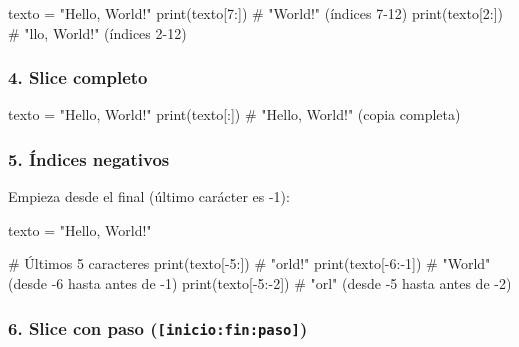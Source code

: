 \documentclass[
  doc,
  floatsintext,
  longtable,
  a4paper,
  nolmodern,
  notxfonts,
  notimes,
  12pt,
  colorlinks=true,linkcolor=blue,citecolor=blue,urlcolor=blue]{apa7}
\newenvironment{Shaded}{\begin{snugshade}}{\end{snugshade}}
\newcommand{\BuiltInTok}[1]{\textcolor[rgb]{0.00,0.23,0.31}{#1}}
\newcommand{\CommentTok}[1]{\textcolor[rgb]{0.37,0.37,0.37}{#1}}
\newcommand{\DecValTok}[1]{\textcolor[rgb]{0.68,0.00,0.00}{#1}}
\newcommand{\NormalTok}[1]{\textcolor[rgb]{0.00,0.23,0.31}{#1}}
\newcommand{\OperatorTok}[1]{\textcolor[rgb]{0.37,0.37,0.37}{#1}}
\newcommand{\StringTok}[1]{\textcolor[rgb]{0.13,0.47,0.30}{#1}}
\begin{document}
\begin{Shaded}
\begin{Highlighting}[]
\NormalTok{texto }\OperatorTok{=} \StringTok{"Hello, World!"}
\BuiltInTok{print}\NormalTok{(texto[}\DecValTok{7}\NormalTok{:])   }\CommentTok{\# "World!" (índices 7{-}12)}
\BuiltInTok{print}\NormalTok{(texto[}\DecValTok{2}\NormalTok{:])   }\CommentTok{\# "llo, World!" (índices 2{-}12)}
\end{Highlighting}
\end{Shaded}

\subsubsection{4. Slice completo}\label{slice-completo}

\begin{Shaded}
\begin{Highlighting}[]
\NormalTok{texto }\OperatorTok{=} \StringTok{"Hello, World!"}
\BuiltInTok{print}\NormalTok{(texto[:])    }\CommentTok{\# "Hello, World!" (copia completa)}
\end{Highlighting}
\end{Shaded}

\subsubsection{5. Índices negativos}\label{uxedndices-negativos}

Empieza desde el final (último carácter es -1):

\begin{Shaded}
\begin{Highlighting}[]
\NormalTok{texto }\OperatorTok{=} \StringTok{"Hello, World!"}

\CommentTok{\# Últimos 5 caracteres}
\BuiltInTok{print}\NormalTok{(texto[}\OperatorTok{{-}}\DecValTok{5}\NormalTok{:])   }\CommentTok{\# "orld!"}
\BuiltInTok{print}\NormalTok{(texto[}\OperatorTok{{-}}\DecValTok{6}\NormalTok{:}\OperatorTok{{-}}\DecValTok{1}\NormalTok{]) }\CommentTok{\# "World" (desde {-}6 hasta antes de {-}1)}
\BuiltInTok{print}\NormalTok{(texto[}\OperatorTok{{-}}\DecValTok{5}\NormalTok{:}\OperatorTok{{-}}\DecValTok{2}\NormalTok{]) }\CommentTok{\# "orl" (desde {-}5 hasta antes de {-}2)}
\end{Highlighting}
\end{Shaded}

\subsubsection{\texorpdfstring{6. Slice con paso
(\texttt{{[}inicio:fin:paso{]}})}{6. Slice con paso ({[}inicio:fin:paso{]})}}\label{slice-con-paso-iniciofinpaso}
\end{document}
